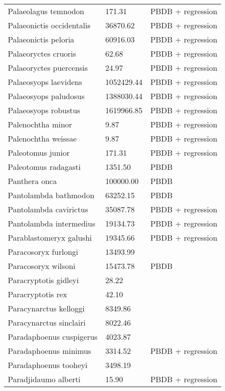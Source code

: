 \documentclass{article}
\begin{document}
\begin{center}
\begin{longtable}{p{} p{} p{}}
    Palaeolagus temnodon & 171.31 & PBDB + regression \\ 
    Palaeonictis occidentalis & 36870.62 & PBDB + regression \\ 
    Palaeonictis peloria & 60916.03 & PBDB + regression \\ 
    Palaeoryctes cruoris & 62.68 & PBDB + regression \\ 
    Palaeoryctes puercensis & 24.97 & PBDB + regression \\ 
    Palaeosyops laevidens & 1052429.44 & PBDB + regression \\ 
    Palaeosyops paludosus & 1388030.44 & PBDB + regression \\ 
    Palaeosyops robustus & 1619966.85 & PBDB + regression \\ 
    Palenochtha minor & 9.87 & PBDB + regression \\ 
    Palenochtha weissae & 9.87 & PBDB + regression \\ 
    Paleotomus junior & 171.31 & PBDB + regression \\ 
    Paleotomus radagasti & 1351.50 & PBDB \\ 
    Panthera onca & 100000.00 & PBDB \\ 
    Pantolambda bathmodon & 63252.15 & PBDB \\ 
    Pantolambda cavirictus & 35087.78 & PBDB + regression \\ 
    Pantolambda intermedius & 19134.73 & PBDB + regression \\ 
    Parablastomeryx galushi & 19345.66 & PBDB + regression \\ 
    Paracosoryx furlongi & 13493.99 & \cite{Tomiya2013} \\ 
    Paracosoryx wilsoni & 15473.78 & PBDB \\ 
    Paracryptotis gidleyi & 28.22 & \cite{Tomiya2013} \\ 
    Paracryptotis rex & 42.10 & \cite{Tomiya2013} \\ 
    Paracynarctus kelloggi & 8349.86 & \cite{Tomiya2013} \\ 
    Paracynarctus sinclairi & 8022.46 & \cite{Tomiya2013} \\ 
    Paradaphoenus cuspigerus & 4023.87 & \cite{Tomiya2013} \\ 
    Paradaphoenus minimus & 3314.52 & PBDB + regression \\ 
    Paradaphoenus tooheyi & 3498.19 & \cite{Tomiya2013} \\ 
    Paradjidaumo alberti & 15.90 & PBDB + regression \\ 

\end{longtable}
\end{center}
\end{document}
